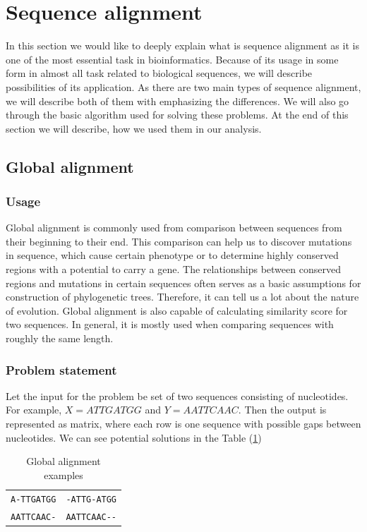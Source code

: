 \section{Sequence alignment}
In this section we would like to deeply explain what is sequence alignment as it is one of the most essential task in bioinformatics.
Because of its usage in some form in almost all task related to biological sequences, we will describe possibilities of its application.
As there are two main types of sequence alignment, we will describe both of them with emphasizing the differences.
We will also go through the basic algorithm used for solving these problems.
At the end of this section we will describe, how we used them in our analysis.

\subsection{Global alignment}

\subsubsection{Usage}
Global alignment is commonly used from comparison between sequences from their beginning to their end.
This comparison can help us to discover mutations in sequence, which cause certain phenotype or to determine highly conserved regions with a potential to carry a gene.
The relationships between conserved regions and mutations in certain sequences often serves as a basic assumptions for construction of phylogenetic trees.
Therefore, it can tell us a lot about the nature of evolution.
Global alignment is also capable of calculating similarity score for two sequences.
In general, it is mostly used when comparing sequences with roughly the same length.

\subsubsection{Problem statement}
Let the input for the problem be set of two sequences consisting of nucleotides.
For example, $ X = ATTGATGG $ and $ Y = AATTCAAC $.
Then the output is represented as matrix, where each row is one sequence with possible gaps between nucleotides.
We can see potential solutions in the Table (\ref{tab:potsol})

\begin{table}
  \centering
    \begin{tabular}{ l | r }
    \verb|A-TTGATGG| & \verb|-ATTG-ATGG| \\
    \verb|AATTCAAC-| & \verb|AATTCAAC--| \\
    \end{tabular}
  \caption{Global alignment examples}
  \label{tab:potsol}
\end{table} 

